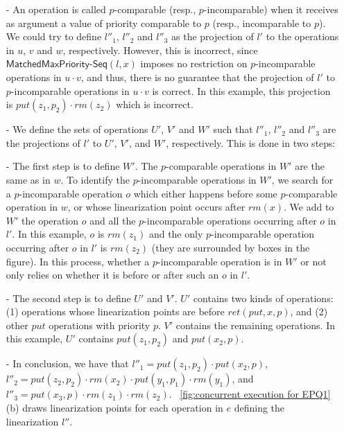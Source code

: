 \begin{itemize}
\setlength{\itemsep}{0.5pt}
\item[-] An operation is called $p$-comparable (resp., $p$-incomparable) when it receives as argument a value of priority comparable to $p$ (resp., incomparable to $p$). We could try to define $l''_1$, $l''_2$ and $l''_3$ as the projection of $l'$ to the operations in $u$, $v$ and $w$, respectively. However, this is incorrect, since $\mathsf{MatchedMaxPriority\text{-}Seq}(l,x)$ imposes no restriction on  $p$-incomparable operations in $u \cdot v$, and thus, there is no guarantee that the projection of $l'$ to $p$-incomparable operations in $u \cdot v$ is correct. In this example, this projection is $\textit{put}(z_1,p_2) \cdot \textit{rm}(z_2)$ which is incorrect.

\item[-] We define the sets of operations $U'$, $V'$ and $W'$ such that $l''_1$, $l''_2$ and $l''_3$ are the projections of $l'$ to $U'$, $V'$, and $W'$, respectively. This is done in two steps:

\item[-] The first step is to define $W'$. The $p$-comparable operations in $W'$ are the same as in $w$. To identify the $p$-incomparable operations in $W'$, we search for a $p$-incomparable operation $o$ which either happens before some $p$-comparable operation in $w$, or whose linearization point occurs after $\textit{rm}(x)$. We add to $W'$ the operation $o$ and all the $p$-incomparable operations occurring after $o$ in $l'$. In this example, $o$ is $\textit{rm}(z_1)$ and the only $p$-incomparable operation occurring after $o$ in $l'$ is $\textit{rm}(z_2)$ (they are surrounded by boxes in the figure). In this process, whether a $p$-incomparable operation is in $W'$ or not only relies on whether it is before or after such an $o$ in $l'$.

\item[-] The second step is to define $U'$ and $V'$. $U'$ contains two kinds of operations: (1) operations whose linearization points are before $\textit{ret}(\textit{put},x,p)$, and (2) other $\textit{put}$ operations with priority $p$. $V'$ contains the remaining operations. In this example, $U'$ contains $\textit{put}(z_1,p_2)$ and $\textit{put}(x_2,p)$.

\item[-] In conclusion, we have that $l''_1 = \textit{put}(z_1,p_2) \cdot \textit{put}(x_2,p)$, $l''_2 = \textit{put}(z_2,p_2) \cdot \textit{rm}(x_2) \cdot \textit{put}(y_1,p_1) \cdot \textit{rm}(y_1)$, and $l''_3 = \textit{put}(x_3,p) \cdot \textit{rm}(z_1) \cdot \textit{rm}(z_2)$. \figurename~\ref{fig:concurrent execution for EPQ1}(b) draws linearization points for each operation in $e$ defining the linearization $l''$.
\end{itemize}


